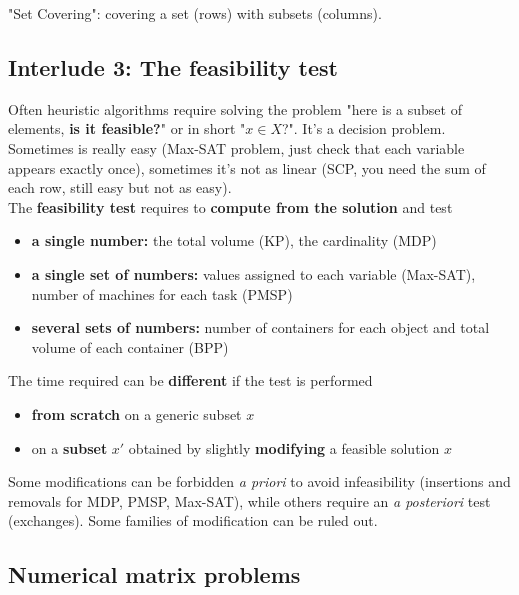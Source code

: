 "Set Covering": covering a set (rows) with subsets (columns).\\

\newpage

\subsection*{Interlude 3: The feasibility test}
Often heuristic algorithms require solving the problem "here is a subset of elements, \textbf{is it feasible?}" or in short "$x \in X$?". It's a decision problem.\\

Sometimes is really easy (Max-SAT problem, just check that each variable appears exactly once), sometimes it's not as linear (SCP, you need the sum of each row, still easy but not as easy).\\

The \textbf{feasibility test} requires to \textbf{compute from the solution} and test
\begin{itemize}
	\item \textbf{a single number:} the total volume (KP), the cardinality (MDP)
	\item \textbf{a single set of numbers:} values assigned to each variable (Max-SAT), number of machines for each task (PMSP)
	\item \textbf{several sets of numbers:} number of containers for each object and total volume of each container (BPP)
\end{itemize}
\nn

The time required can be \textbf{different} if the test is performed
\begin{itemize}
	\item \textbf{from scratch} on a generic subset $x$
	\item on a \textbf{subset} $x'$ obtained by slightly \textbf{modifying} a feasible solution $x$
\end{itemize}
\nn

Some modifications can be forbidden \textit{a priori} to avoid infeasibility (insertions and removals for MDP, PMSP, Max-SAT), while others require an \textit{a posteriori} test (exchanges). Some families of modification can be ruled out.\\


\newpage

\subsection{Numerical matrix problems}

